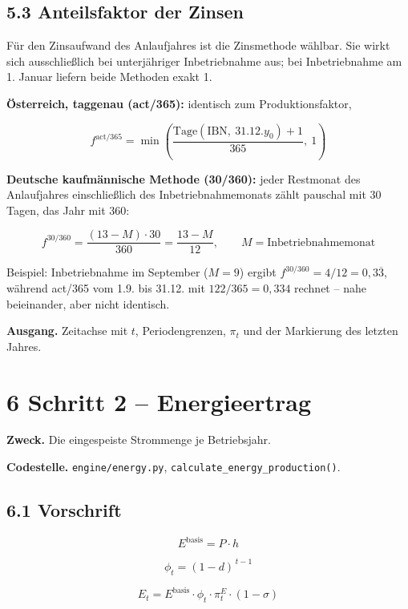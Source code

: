 \documentclass[
  a4paper,
  10pt]{article}
\begin{document}
\hypertarget{anteilsfaktor-der-zinsen}{%
\subsection{5.3 Anteilsfaktor der
Zinsen}\label{anteilsfaktor-der-zinsen}}

Für den Zinsaufwand des Anlaufjahres ist die Zinsmethode wählbar. Sie
wirkt sich ausschließlich bei unterjähriger Inbetriebnahme aus; bei
Inbetriebnahme am 1. Januar liefern beide Methoden exakt 1.

\textbf{Österreich, taggenau (act/365):} identisch zum
Produktionsfaktor,

\[ f^{\mathrm{act/365}} = \min\left(\frac{\mathrm{Tage}(\text{IBN},\ 31.12.y_0) + 1}{365},\ 1\right) \]

\textbf{Deutsche kaufmännische Methode (30/360):} jeder Restmonat des
Anlaufjahres einschließlich des Inbetriebnahmemonats zählt pauschal mit
30 Tagen, das Jahr mit 360:

\[ f^{30/360} = \frac{(13 - M) \cdot 30}{360} = \frac{13 - M}{12}, \qquad M = \text{Inbetriebnahmemonat} \]

Beispiel: Inbetriebnahme im September (\(M = 9\)) ergibt
\(f^{30/360} = 4/12 = 0{,}3\overline{3}\), während act/365 vom 1.9. bis
31.12. mit \(122/365 = 0{,}334\) rechnet -- nahe beieinander, aber nicht
identisch.

\textbf{Ausgang.} Zeitachse mit \(t\), Periodengrenzen, \(\pi_t\) und
der Markierung des letzten Jahres.

\hypertarget{schritt-2-energieertrag}{%
\section{6 Schritt 2 -- Energieertrag}\label{schritt-2-energieertrag}}

\textbf{Zweck.} Die eingespeiste Strommenge je Betriebsjahr.

\textbf{Codestelle.} \nolinkurl{engine/energy.py},
\texttt{calculate\_energy\_production()}.

\hypertarget{vorschrift}{%
\subsection{6.1 Vorschrift}\label{vorschrift}}

\[ E^{\mathrm{basis}} = P \cdot h \]

\[ \phi_t = (1 - d)^{\,t-1} \]

\[ E_t = E^{\mathrm{basis}} \cdot \phi_t \cdot \pi^{E}_t \cdot (1 - \sigma) \]
\end{document}
